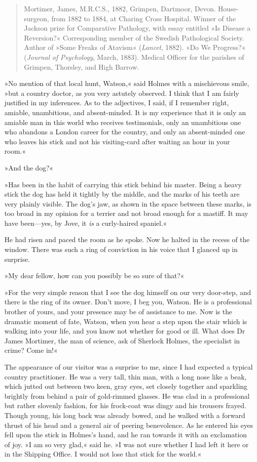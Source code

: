 \begin{quote}Mortimer, James, M.R.C.S., 1882, Grimpen, Dartmoor, Dev\-on. House-surgeon, from 1882 to 1884, at Charing Cross Hospital. Winner of the Jackson prize for Comparative Pathology, with essay entitled »Is Disease a Reversion?« Corresponding member of the Swedish Pathological Society. Author of »Some Freaks of Atavism« (\textit{Lancet}, 1882). »Do We Progress?« (\textit{Journal of Psychology}, March, 1883). Medical Officer for the parishes of Grimpen, Thorsley, and High Barrow.\end{quote}

»No mention of that local hunt, Watson,« said Holmes with a mischievous smile, »but a country doctor, as you very astutely observed. I think that I am fairly justified in my inferences. As to the adjectives, I said, if I remember right, amiable, unambitious, and absent-minded. It is my experience that it is only an amiable man in this world who receives testimonials, only an unambitious one who abandons a London career for the country, and only an absent-minded one who leaves his stick and not his visiting-card after waiting an hour in your room.«

»And the dog?«

»Has been in the habit of carrying this stick behind his master. Being a heavy stick the dog has held it tightly by the middle, and the marks of his teeth are very plainly visible. The dog's jaw, as shown in the space between these marks, is too broad in my opinion for a terrier and not broad enough for a mastiff. It may have been—yes, by Jove, it \emph{is} a curly-haired spaniel.«

He had risen and paced the room as he spoke. Now he halted in the recess of the window. There was such a ring of conviction in his voice that I glanced up in surprise.

»My dear fellow, how can you possibly be so sure of that?«

»For the very simple reason that I see the dog himself on our very door-step, and there is the ring of its owner. Don't move, I beg you, Watson. He is a professional brother of yours, and your presence may be of assistance to me. Now is the dramatic moment of fate, Watson, when you hear a step upon the stair which is walking into your life, and you know not whether for good or ill. What does Dr James Mortimer, the man of science, ask of Sherlock Holmes, the specialist in crime? Come in!«

The appearance of our visitor was a surprise to me, since I had expected a typical country practitioner. He was a very tall, thin man, with a long nose like a beak, which jutted out between two keen, gray eyes, set closely together and sparkling brightly from behind a pair of gold-rimmed glasses. He was clad in a professional but rather slovenly fashion, for his frock-coat was dingy and his trousers frayed. Though young, his long back was already bowed, and he walked with a forward thrust of his head and a general air of peering benevolence. As he entered his eyes fell upon the stick in Holmes's hand, and he ran towards it with an exclamation of joy. »I am so very glad,« said he. »I was not sure whether I had left it here or in the Shipping Office. I would not lose that stick for the world.«

